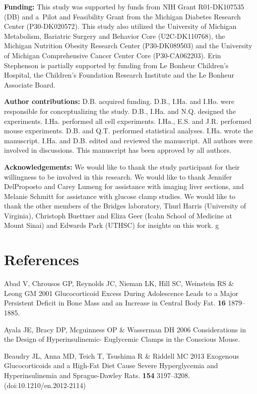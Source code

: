 \documentclass[11pt]{article} %
\begin{document}
\textbf{Funding:} This study was supported by funds from NIH Grant
R01-DK107535 (DB) and a~Pilot and Feasibility Grant from the Michigan
Diabetes Research Center (P30-DK020572). This study also utilized the
University of Michigan Metabolism, Bariatric Surgery and Behavior Core
(U2C-DK110768), the Michigan Nutrition Obesity Research Center
(P30-DK089503) and the University of Michigan Comprehensive Cancer
Center Core (P30-CA062203). Erin Stephenson is partially supported by
funding from Le Bonheur Children's Hospital, the Children's Foundation
Research Institute and the Le Bonheur Associate Board.

\textbf{Author contributions:} D.B. acquired funding. D.B., I.Ha. and
I.Ho. were responsible for conceptualizing the study. D.B., I.Ha. and
N.Q. designed the experiments. I.Ha. performed all cell experiments.
I.Ha., E.S. and J.R. performed mouse experiments. D.B. and Q.T.
performed statistical analyses. I.Ha. wrote the manuscript. I.Ha. and
D.B. edited and reviewed the manuscript. All authors were involved in
discussions. This manuscript has been approved by all authors.

\textbf{Acknowledgements:} We would like to thank the study participant
for their willingness to be involved in this research. We would like to
thank Jennifer DelProposto and Carey Lumeng for assistance with imaging
liver sections, and Melanie Schmitt for assistance with glucose clamp
studies. We would like to thank the other members of the Bridges
laboratory, Thurl Harris (University of Virginia), Christoph Buettner
and Eliza Geer (Icahn School of Medicine at Mount Sinai) and Edwards
Park (UTHSC) for insights on this work. g

\section*{References}

Abad V, Chrousos GP, Reynolds JC, Nieman LK, Hill SC, Weinstein RS \&
Leong GM 2001 Glucocorticoid Excess During Adolescence Leads to a Major
Persistent Deficit in Bone Mass and an Increase in Central Body Fat.
\textbf{16} 1879--1885.

Ayala JE, Bracy DP, Mcguinness OP \& Wasserman DH 2006 Considerations in
the Design of Hyperinsulinemic- Euglycemic Clamps in the Conscious
Mouse.

Beaudry JL, Anna MD, Teich T, Tsushima R \& Riddell MC 2013 Exogenous
Glucocorticoids and a High-Fat Diet Cause Severe Hyperglycemia and
Hyperinsulinemia and Sprague-Dawley Rats. \textbf{154} 3197--3208.
(doi:10.1210/en.2012-2114)
\end{document}
